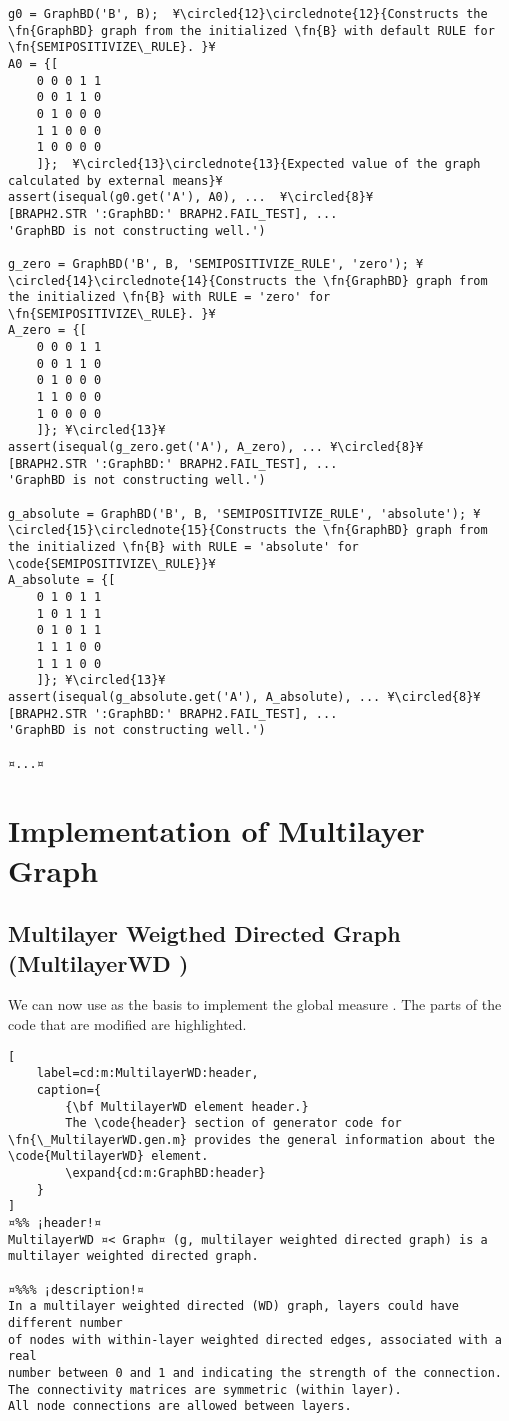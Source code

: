 \documentclass{tufte-handout}
\begin{document}
\begin{lstlisting}
g0 = GraphBD('B', B);  ¥\circled{12}\circlednote{12}{Constructs the \fn{GraphBD} graph from the initialized \fn{B} with default RULE for \fn{SEMIPOSITIVIZE\_RULE}. }¥
A0 = {[
	0 0 0 1 1
	0 0 1 1 0
	0 1 0 0 0
	1 1 0 0 0
	1 0 0 0 0
	]};  ¥\circled{13}\circlednote{13}{Expected value of the graph calculated by external means}¥
assert(isequal(g0.get('A'), A0), ...  ¥\circled{8}¥
[BRAPH2.STR ':GraphBD:' BRAPH2.FAIL_TEST], ...
'GraphBD is not constructing well.')

g_zero = GraphBD('B', B, 'SEMIPOSITIVIZE_RULE', 'zero'); ¥\circled{14}\circlednote{14}{Constructs the \fn{GraphBD} graph from the initialized \fn{B} with RULE = 'zero' for \fn{SEMIPOSITIVIZE\_RULE}. }¥
A_zero = {[
	0 0 0 1 1
	0 0 1 1 0
	0 1 0 0 0
	1 1 0 0 0
	1 0 0 0 0
	]}; ¥\circled{13}¥
assert(isequal(g_zero.get('A'), A_zero), ... ¥\circled{8}¥
[BRAPH2.STR ':GraphBD:' BRAPH2.FAIL_TEST], ...
'GraphBD is not constructing well.')

g_absolute = GraphBD('B', B, 'SEMIPOSITIVIZE_RULE', 'absolute'); ¥\circled{15}\circlednote{15}{Constructs the \fn{GraphBD} graph from the initialized \fn{B} with RULE = 'absolute' for \code{SEMIPOSITIVIZE\_RULE}}¥
A_absolute = {[
	0 1 0 1 1
	1 0 1 1 1
	0 1 0 1 1
	1 1 1 0 0
	1 1 1 0 0
	]}; ¥\circled{13}¥
assert(isequal(g_absolute.get('A'), A_absolute), ... ¥\circled{8}¥
[BRAPH2.STR ':GraphBD:' BRAPH2.FAIL_TEST], ...
'GraphBD is not constructing well.')

¤...¤
\end{lstlisting}

\clearpage
\section{Implementation of Multilayer Graph}

\subsection{Multilayer Weigthed Directed Graph (MultilayerWD )}


We can now use  as the basis to implement the global measure .
The parts of the code that are modified are highlighted.

\begin{lstlisting}[
	label=cd:m:MultilayerWD:header,
	caption={
		{\bf MultilayerWD element header.}
		The \code{header} section of generator code for \fn{\_MultilayerWD.gen.m} provides the general information about the \code{MultilayerWD} element.
		\expand{cd:m:GraphBD:header}
	}
]
¤%% ¡header!¤
MultilayerWD ¤< Graph¤ (g, multilayer weighted directed graph) is a multilayer weighted directed graph.

¤%%% ¡description!¤
In a multilayer weighted directed (WD) graph, layers could have different number 
of nodes with within-layer weighted directed edges, associated with a real
number between 0 and 1 and indicating the strength of the connection.
The connectivity matrices are symmetric (within layer).
All node connections are allowed between layers.
\end{lstlisting}
\end{document}
